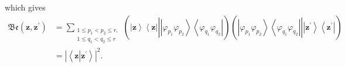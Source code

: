 \documentclass[aps,preprint]{revtex4}%
\begin{document}
which gives
\begin{align}
\mathfrak{Be}\left(  \mathbf{z,z}^{\prime}\right)   &  =\sum_{\substack{1\leq
p_{1}<p_{2}\leq r,\\1\leq q_{1}<q_{2}\leq r}}\left(  \left\vert \mathbf{z}%
\right\rangle \left\langle \mathbf{z}\right\vert \left\vert
\overset{}{\left\vert \varphi_{p_{1}}\varphi_{p_{2}}\right\rangle \left\langle
\varphi_{q_{1}}\varphi_{q_{2}}\right\vert }\right.  \right)  \left(  \left.
\overset{}{\left\vert \varphi_{p_{1}}\varphi_{p_{2}}\right\rangle \left\langle
\varphi_{q_{1}}\varphi_{q_{2}}\right\vert }\right\vert \left\vert
\mathbf{z}^{\prime}\right\rangle \left\langle \mathbf{z}^{\prime}\right\vert
\right) \nonumber\\
&  =\left\vert \left\langle \mathbf{z}\left\vert \mathbf{z}^{\prime}\right.
\right\rangle \right\vert ^{2}.
\end{align}
\end{document}
